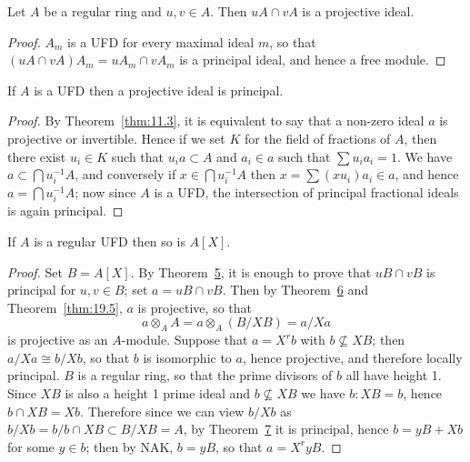 \begin{theorem}\label{thm:20.6}
Let $A$ be a regular ring and $u, v \in A$. Then $uA \cap vA$ is a
projective ideal.
\end{theorem}

\begin{proof}
$A_m$ is a UFD for every maximal ideal $m$, so that $(uA \cap vA)A_m =
uA_m \cap vA_m$ is a principal ideal, and hence a free module.
\end{proof}

\begin{theorem}\label{thm:20.7}
If $A$ is a UFD then a projective ideal is principal.
\end{theorem}

\begin{proof}
By Theorem~\ref{thm:11.3}, it is equivalent to say that a non-zero ideal $a$ is
projective or invertible. Hence if we set $K$ for the field of fractions of $A$,
then there exist $u_i \in K$ such that $u_ia \subset A$ and $a_i \in a$ such that $\sum u_ia_i = 1$.
We have $a \subset \bigcap u_i^{-1}A$, and conversely if $x \in \bigcap u_i^{-1}A$ then $x =
\sum (xu_i)a_i \in a$, and hence $a = \bigcap u_i^{-1}A$; now since $A$ is a UFD, the intersection
of principal fractional ideals is again principal.
\end{proof}

\begin{theorem}\label{thm:20.8}
If $A$ is a regular UFD then so is $A[X]$.
\end{theorem}

\begin{proof}
Set $B = A[X]$. By Theorem~\hyperref[thm:20.5]{5}, it is enough to prove that $uB \cap vB$
is principal for $u, v \in B$; set $a = uB \cap vB$. Then by Theorem~\hyperref[thm:20.6]{6} and
Theorem~\ref{thm:19.5}, $a$ is projective, so that
\[
  a \otimes_A A = a \otimes_A (B/XB) = a/Xa
\]
is projective as an $A$-module. Suppose that $a = X^rb$ with $b \nsubseteq XB$; then
$a/Xa \cong b/Xb$, so that $b$ is isomorphic to $a$, hence projective, and therefore
locally principal. $B$ is a regular ring, so that the prime divisors of $b$ all
have height 1. Since $XB$ is also a height 1 prime ideal and $b \nsubseteq XB$ we
have $b:XB = b$, hence $b \cap XB = Xb$. Therefore since we can view $b/Xb$
as $b/Xb = b/b \cap XB \subset B/XB = A$, by Theorem~\hyperref[thm:20.7]{7} it is principal, hence
$b = yB + Xb$ for some $y \in b$; then by NAK, $b = yB$, so that $a = X^ryB$.
\end{proof}

